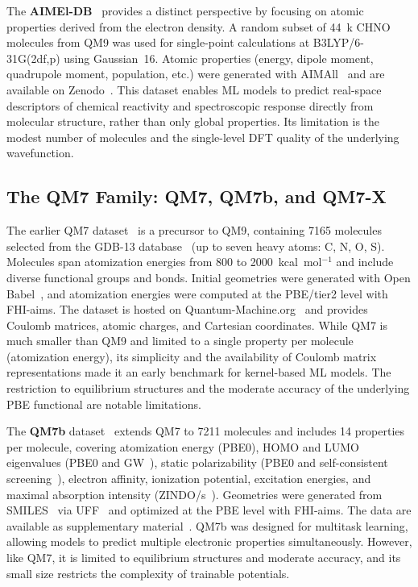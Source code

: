 \documentclass[12pt]{article}
\begin{document}
The \textbf{AIMEl-DB}~\cite{ds5-5} provides a distinct perspective by focusing on atomic properties derived from the electron density. A random subset of 44~k CHNO molecules from QM9 was used for single-point calculations at B3LYP/6-31G(2df,p) using Gaussian~16. Atomic properties (energy, dipole moment, quadrupole moment, population, etc.) were generated with AIMAll~\cite{ds5-73} and are available on Zenodo~\cite{ds5-74}. This dataset enables ML models to predict real-space descriptors of chemical reactivity and spectroscopic response directly from molecular structure, rather than only global properties. Its limitation is the modest number of molecules and the single-level DFT quality of the underlying wavefunction.

\subsection{The QM7 Family: QM7, QM7b, and QM7-X}

The earlier QM7 dataset~\cite{ds7-32} is a precursor to QM9, containing 7165 molecules selected from the GDB-13 database~\cite{ds7-77} (up to seven heavy atoms: C, N, O, S). Molecules span atomization energies from 800 to 2000~kcal~mol$^{-1}$ and include diverse functional groups and bonds. Initial geometries were generated with Open Babel~\cite{ds7-82}, and atomization energies were computed at the PBE/tier2 level with FHI-aims. The dataset is hosted on Quantum-Machine.org~\cite{ds7-83} and provides Coulomb matrices, atomic charges, and Cartesian coordinates. While QM7 is much smaller than QM9 and limited to a single property per molecule (atomization energy), its simplicity and the availability of Coulomb matrix representations made it an early benchmark for kernel-based ML models. The restriction to equilibrium structures and the moderate accuracy of the underlying PBE functional are notable limitations.

The \textbf{QM7b} dataset~\cite{ds8-34} extends QM7 to 7211 molecules and includes 14 properties per molecule, covering atomization energy (PBE0), HOMO and LUMO eigenvalues (PBE0 and GW~\cite{ds8-86}), static polarizability (PBE0 and self-consistent screening~\cite{ds8-76}), electron affinity, ionization potential, excitation energies, and maximal absorption intensity (ZINDO/s~\cite{ds8-53}). Geometries were generated from SMILES~\cite{ds8-84} via UFF~\cite{ds8-85} and optimized at the PBE level with FHI-aims. The data are available as supplementary material~\cite{ds8-88}. QM7b was designed for multitask learning, allowing models to predict multiple electronic properties simultaneously. However, like QM7, it is limited to equilibrium structures and moderate accuracy, and its small size restricts the complexity of trainable potentials.
\end{document}
